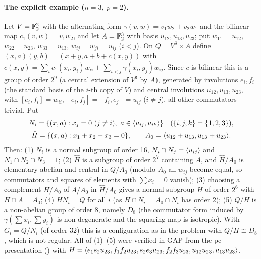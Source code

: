 \paragraph{The explicit example ($n=3$, $p=2$).} Let $V=\mathbb{F}_2^2$ with the alternating form $\gamma(v,w)=v_1w_2+v_2w_1$
and the bilinear map $c_1(v,w)=v_1w_2$, and let $A=\mathbb{F}_2^3$ with basis $u_{12},u_{13},u_{23}$; put $w_{11}=u_{12}$,
$w_{22}=u_{23}$, $w_{33}=u_{13}$, $w_{ij}=w_{ji}=u_{ij}$ ($i<j$). On $Q=V^3\times A$ define
$(x,a)(y,b)=(x+y,a+b+c(x,y))$ with $c(x,y)=\sum_i c_1(x_i,y_i)w_{ii}+\sum_{i<j}\gamma(x_i,y_j)w_{ij}$. Since $c$ is
bilinear this is a group of order $2^9$ (a central extension of $V^3$ by $A$), generated by involutions $e_i,f_i$
(the standard basis of the $i$-th copy of $V$) and central involutions $u_{12},u_{13},u_{23}$, with
$[e_i,f_i]=w_{ii}$, $[e_i,f_j]=[f_i,e_j]=u_{ij}$ ($i\ne j$), all other commutators trivial. Put
\begin{gather*} N_i=\{(x,a):x_j=0\ (j\ne i),\ a\in\gen{u_{ij},u_{ik}}\}\quad(\{i,j,k\}=\{1,2,3\}),\\
\hat H=\{(x,a):x_1+x_2+x_3=0\},\qquad A_0=\gen{u_{12}+u_{13},u_{13}+u_{23}}. \end{gather*}
Then: (1) $N_i$ is a normal subgroup of order 16, $N_i\cap N_j=\langle u_{ij}\rangle$ and $N_1\cap N_2\cap N_3=1$;
(2) $\hat H$ is a subgroup of order $2^7$ containing $A$, and $\hat H/A_0$ is elementary abelian and central in
$Q/A_0$ (modulo $A_0$ all $w_{ij}$ become equal, so commutators and squares of elements with $\sum x_i=0$ vanish);
(3) choosing a complement $H/A_0$ of $A/A_0$ in $\hat H/A_0$ gives a normal subgroup $H$ of order $2^6$ with
$H\cap A=A_0$; (4) $HN_i=Q$ for all $i$ (as $H\cap N_i=A_0\cap N_i$ has order 2); (5) $Q/H$ is a non-abelian group of
order 8, namely $D_8$ (the commutator form induced by $\gamma(\sum x_i,\sum y_i)$ is non-degenerate and the squaring
map is isotropic). With $G_i=Q/N_i$ (of order 32) this is a configuration as in the problem with $Q/H\cong D_8$,
which is not regular. All of (1)--(5) were verified in GAP from the pc presentation
() with $H=\langle e_1e_2u_{23},f_1f_2u_{23},e_2e_3u_{23},f_2f_3u_{23},u_{12}u_{23},
u_{13}u_{23}\rangle$.

